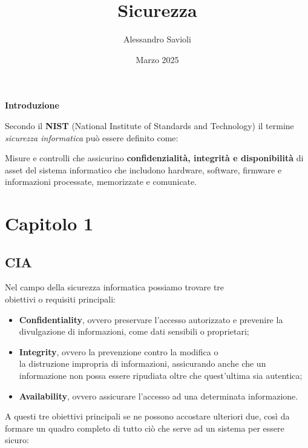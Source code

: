 \documentclass[14pt]{extarticle}
\begin{document}
\title{Sicurezza}
\author{Alessandro Savioli}
\date{Marzo 2025}

\maketitle

\tableofcontents

\newpage

\textbf{Introduzione}

\noindent Secondo il \textbf{NIST} (National Institute of Standards and
Technology) il termine \textit{sicurezza informatica} può essere definito come:

\begin{center}
    Misure e controlli che assicurino \textbf{confidenzialità, integrità e
    disponibilità} di asset del sistema informatico che includono hardware,
    software, firmware e informazioni processate, memorizzate e comunicate.
\end{center}

\section{Capitolo 1}

\subsection{CIA}

Nel campo della sicurezza informatica possiamo trovare tre \\ obiettivi o
requisiti principali:

\begin{itemize}
    \item \textbf{Confidentiality}, ovvero preservare l'accesso autorizzato e
    prevenire la divulgazione di informazioni, come dati sensibili o
    proprietari;
    \item \textbf{Integrity}, ovvero la prevenzione contro la modifica o \\ la
    distruzione impropria di informazioni, assicurando anche che un informazione
    non possa essere ripudiata oltre che quest'ultima sia autentica;
    \item \textbf{Availability}, ovvero assicurare l'accesso ad una determinata
    informazione.  
\end{itemize}

A questi tre obiettivi principali se ne possono accostare ulteriori due, così da
formare un quadro completo di tutto ciò che serve ad un sistema per essere
sicuro:
\end{document}
